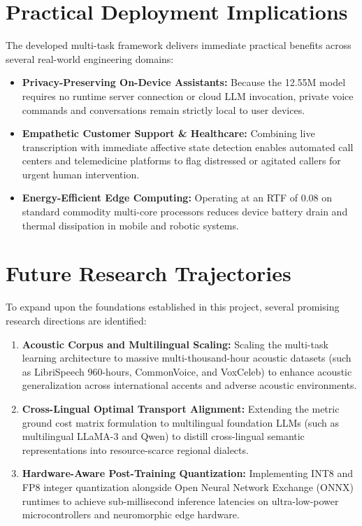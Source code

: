\section{Practical Deployment Implications}
The developed multi-task framework delivers immediate practical benefits across several real-world engineering domains:
\begin{itemize}
    \item \textbf{Privacy-Preserving On-Device Assistants:} Because the 12.55M model requires no runtime server connection or cloud LLM invocation, private voice commands and conversations remain strictly local to user devices.
    \item \textbf{Empathetic Customer Support & Healthcare:} Combining live transcription with immediate affective state detection enables automated call centers and telemedicine platforms to flag distressed or agitated callers for urgent human intervention.
    \item \textbf{Energy-Efficient Edge Computing:} Operating at an RTF of 0.08 on standard commodity multi-core processors reduces device battery drain and thermal dissipation in mobile and robotic systems.
\end{itemize}

\section{Future Research Trajectories}
To expand upon the foundations established in this project, several promising research directions are identified:
\begin{enumerate}
    \item \textbf{Acoustic Corpus and Multilingual Scaling:} Scaling the multi-task learning architecture to massive multi-thousand-hour acoustic datasets (such as LibriSpeech 960-hours, CommonVoice, and VoxCeleb) to enhance acoustic generalization across international accents and adverse acoustic environments.
    \item \textbf{Cross-Lingual Optimal Transport Alignment:} Extending the metric ground cost matrix formulation to multilingual foundation LLMs (such as multilingual LLaMA-3 and Qwen) to distill cross-lingual semantic representations into resource-scarce regional dialects.
    \item \textbf{Hardware-Aware Post-Training Quantization:} Implementing INT8 and FP8 integer quantization alongside Open Neural Network Exchange (ONNX) runtimes to achieve sub-millisecond inference latencies on ultra-low-power microcontrollers and neuromorphic edge hardware.
\end{enumerate}
